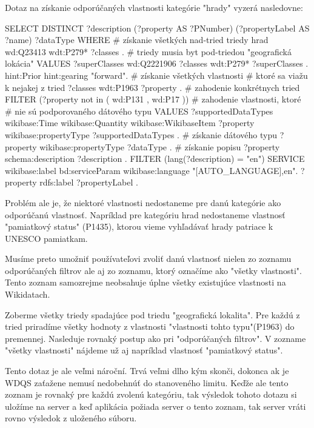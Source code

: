 Dotaz na získanie odporúčaných vlastnosti kategórie "hrady" vyzerá nasledovne:
\begin{code}
      SELECT DISTINCT
      ?description
      (?property AS ?PNumber)
      (?propertyLabel AS ?name)
      ?dataType
      WHERE {
      # získanie všetkých nad-tried triedy hrad
      wd:Q23413 wdt:P279* ?classes .
      # triedy musia byt pod-triedou "geografická lokácia"
      VALUES ?superClasses {wd:Q2221906  }
      ?classes wdt:P279* ?superClasses .
      hint:Prior hint:gearing "forward".
      # získanie všetkých vlastnosti
      # ktoré sa viažu k nejakej z tried
      ?classes wdt:P1963 ?property .
      # zahodenie konkrétnych tried
      FILTER (?property not in ( wd:P131 , wd:P17 ))
      # zahodenie vlastnosti, ktoré
      # nie sú podporovaného dátového typu
      VALUES ?supportedDataTypes {
      wikibase:Time
      wikibase:Quantity
      wikibase:WikibaseItem  }
      ?property wikibase:propertyType ?supportedDataTypes .
      # získanie dátového typu
      ?property wikibase:propertyType ?dataType .
      # získanie popisu
      ?property schema:description ?description .
      FILTER (lang(?description) = "en")
      SERVICE wikibase:label {
      bd:serviceParam wikibase:language "[AUTO_LANGUAGE],en".
      ?property rdfs:label ?propertyLabel . }
      }
\end{code}

Problém ale je, že niektoré vlastnosti nedostaneme pre danú kategórie ako odporúčanú vlastnosť. Napríklad pre kategóriu hrad
nedostaneme vlastnosť "pamiatkový status" (P1435), ktorou vieme vyhľadávať hrady patriace k UNESCO pamiatkam.

Musíme preto umožniť používateľovi zvoliť danú vlastnosť nielen zo zoznamu odporúčaných filtrov ale aj zo zoznamu, ktorý označíme ako
"všetky vlastnosti". Tento zoznam samozrejme neobsahuje úplne všetky existujúce vlastnosti na Wikidatach.

Zoberme všetky triedy spadajúce pod triedu "geografická lokalita".
Pre každú z tried priradíme všetky hodnoty z vlastnosti "vlastnosti tohto typu"(P1963)
do premennej. Nasleduje rovnaký postup ako pri "odporúčaných filtrov".
V zozname "všetky vlastnosti" nájdeme už aj napríklad vlastnosť "pamiatkový status".

Tento dotaz je ale veľmi nároční. Trvá veľmi dlho kým skonči, dokonca ak je WDQS zaťažene nemusí nedobehnúť do stanoveného limitu.
Keďže ale tento zoznam je rovnaký pre každú zvolenú kategóriu, tak výsledok tohoto dotazu si uložíme na server
a keď aplikácia požiada server o tento zoznam, tak server vráti rovno výsledok z uloženého súboru.

